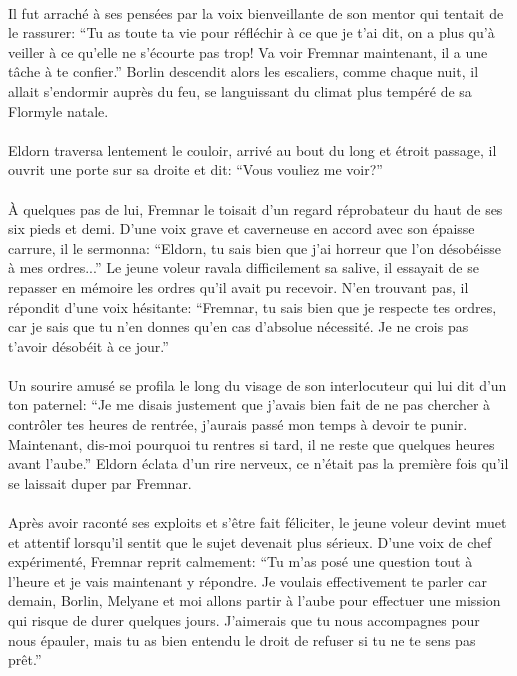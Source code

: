 \paragraph{}
Il fut arraché à ses pensées par la voix bienveillante de son mentor qui
tentait de le rassurer: ``Tu as toute ta vie pour réfléchir à ce que je t'ai
dit, on a plus qu'à veiller à ce qu'elle ne s'écourte pas trop! Va voir
Fremnar maintenant, il a une tâche à te confier.'' Borlin descendit alors les
escaliers, comme chaque nuit, il allait s'endormir auprès du feu, se
languissant du climat plus tempéré de sa Flormyle natale.

\paragraph{}
Eldorn traversa lentement le couloir, arrivé au bout du long et étroit
passage, il ouvrit une porte sur sa droite et dit: ``Vous vouliez me voir?''

\paragraph{}
À quelques pas de lui, Fremnar le toisait d'un regard réprobateur du haut de
ses six pieds et demi. D'une voix grave et caverneuse en accord avec son
épaisse carrure, il le sermonna: ``Eldorn, tu sais bien que j'ai horreur que
l'on désobéisse à mes ordres...'' Le jeune voleur ravala difficilement sa
salive, il essayait de se repasser en mémoire les ordres qu'il avait pu
recevoir. N'en trouvant pas, il répondit d'une voix hésitante: ``Fremnar, tu
sais bien que je respecte tes ordres, car je sais que tu n'en donnes qu'en cas
d'absolue nécessité. Je ne crois pas t'avoir désobéit à ce jour.''

\paragraph{}
Un sourire amusé se profila le long du visage de son interlocuteur qui lui dit
d'un ton paternel: ``Je me disais justement que j'avais bien fait de ne pas
chercher à contrôler tes heures de rentrée, j'aurais passé mon temps à devoir
te punir. Maintenant, dis-moi pourquoi tu rentres si tard, il ne reste que
quelques heures avant l'aube.'' Eldorn éclata d'un rire nerveux, ce n'était
pas la première fois qu'il se laissait duper par Fremnar.

\paragraph{}
Après avoir raconté ses exploits et s'être fait féliciter, le jeune voleur
devint muet et attentif lorsqu'il sentit que le sujet devenait plus sérieux.
D'une voix de chef expérimenté, Fremnar reprit calmement: ``Tu m'as posé une
question tout à l'heure et je vais maintenant y répondre. Je voulais
effectivement te parler car demain, Borlin, Melyane et moi allons partir à
l'aube pour effectuer une mission qui risque de durer quelques jours.
J'aimerais que tu nous accompagnes pour nous épauler, mais tu as bien entendu
le droit de refuser si tu ne te sens pas prêt.''

